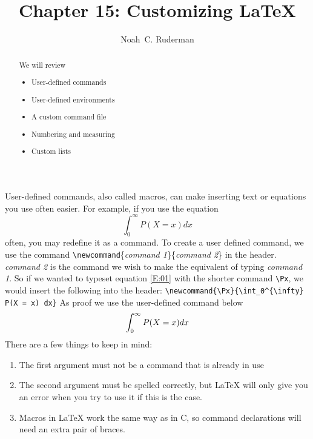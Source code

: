 \documentclass{amsart}
\begin{document}
	\title{Chapter 15: Customizing \LaTeX}
	\author[N.\, C. Ruderman]{Noah~C. Ruderman}

	\begin{abstract}
		We will review
		\begin{center}
		\begin{itemize}
			\item User-defined commands
			\item User-defined environments
			\item A custom command file
			\item Numbering and measuring
			\item Custom lists
		\end{itemize}
		\end{center}
	\end{abstract}

	\maketitle 

	User-defined commands, also called macros, can make inserting
	text or equations you use often easier.
	For example, if you use the equation 
	\begin{equation}\label{E:01}
		\int_0^{\infty} P(X = x) dx
	\end{equation}
	often, you may redefine it as a command. 
	To create a user defined command, we use the command
	\verb+\newcommand+\{\emph{command 1}\}\{\emph{command 2}\} in the
	header. 
	\emph{command 2} is the command we wish to make the equivalent
	of typing \emph{command 1}.
	So if we wanted to typeset equation \eqref{E:01} with the shorter 
	command \verb+\Px+, we would insert the following into the 
	header:
	\verb+\newcommand{\Px}{\int_0^{\infty} P(X = x) dx}+
	As proof we use the user-defined command below
	\begin{equation}
		\Px
	\end{equation}
	There are a few things to keep in mind:
	\begin{enumerate}
		\item
			The first argument must not be a command that is already in use
		\item
			The second argument must be spelled correctly, but \LaTeX{} will
			only give you an error when you try to use it if this is the case.
		\item
			Macros in \LaTeX{} work the same way as in C, so command 
			declarations will need an extra pair of braces. 
	\end{enumerate}
\end{document}
